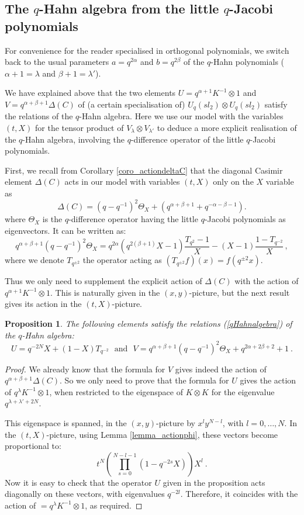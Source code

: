 \documentclass[a4paper,12pt]{article}
\numberwithin{equation}{section}
\newtheorem{prop}[theo]{Proposition}
\theoremstyle{rem}
\theoremstyle{definition}
\begin{document}
\subsection{The $q$-Hahn algebra from the little $q$-Jacobi polynomials}

For convenience for the reader specialised in orthogonal polynomials, we switch back to the usual parameters $a=q^{2\alpha}$ and $b=q^{2\beta}$ of the $q$-Hahn polynomials ($\alpha+1=\lambda$ and $\beta+1=\lambda'$).

We have explained above that the two elements $U=q^{\alpha+1}K^{-1}\otimes 1$ and $V=q^{\alpha+\beta+1}\Delta(C)$ of (a certain specialisation of) $U_q(sl_2)\otimes U_q(sl_2)$ satisfy the relations of the $q$-Hahn algebra. Here we use our model with the variables $(t,X)$ for the tensor product of $V_{\lambda}\otimes V_{\lambda'}$ to deduce a more explicit realisation of the $q$-Hahn algebra, involving the $q$-difference operator of the little $q$-Jacobi polynomials.

First, we recall from Corollary \ref{coro_actiondeltaC} that the diagonal Casimir element $\Delta(C)$ acts in our model with variables $(t,X)$ only on the $X$ variable as
\[\Delta(C)=(q-q^{-1})^2\Theta_X+(q^{\alpha+\beta+1}+q^{-\alpha-\beta-1}). \]
where $\Theta_X$ is the $q$-difference operator having the little $q$-Jacobi polynomials as eigenvectors. It can be written as:
\[q^{\alpha+\beta+1}(q-q^{-1})^2\Theta_X=q^{2\alpha}(q^{2(\beta+1)}X-1)\frac{T_{q^2}-1}{X}-(X-1)\frac{1-T_{q^{-2}}}{X}\,,\]
where we denote $T_{q^{\pm2}}$ the operator acting as $(T_{q^{\pm2}}f)(x)=f(q^{\pm2}x)$.

Thus we only need to supplement the explicit action of $\Delta(C)$ with the action of $q^{\alpha+1}K^{-1}\otimes 1$. This is naturally given in the $(x,y)$-picture, but the next result gives its action in the $(t,X)$-picture.

\begin{prop}
The following elements satisfy the relations (\ref{qHahnalgebra}) of the $q$-Hahn algebra:
\[U=q^{-2N}X+(1-X)T_{q^{-2}}\ \ \ \text{and}\ \ \ V=q^{\alpha+\beta+1}(q-q^{-1})^2\Theta_X+q^{2\alpha+2\beta+2}+1\ .\]
\end{prop}
\begin{proof}
We already know that the formula for $V$ gives indeed  the action of $q^{\alpha+\beta+1}\Delta(C)$. So we only need to prove that the formula for $U$ gives the action of $q^{\lambda}K^{-1}\otimes 1$, when restricted to the eigenspace of $K\otimes K$ for the eigenvalue $q^{\lambda+\lambda'+2N}$.

This eigenspace is spanned, in the $(x,y)$-picture by $x^{l}y^{N-l}$, with $l=0,\dots,N$. In the $(t,X)$-picture, using Lemma \ref{lemma_actionphi}, these vectors become proportional to:
\[t^{N}\left(\prod_{s=0}^{N-l-1}(1-q^{-2s}X)\right)X^l\ .\]
Now it is easy to check that the operator $U$ given in the proposition acts diagonally on these vectors, with eigenvalues $q^{-2l}$. Therefore, it coincides with the action of $=q^{\lambda}K^{-1}\otimes 1$, as required.
\end{proof}
\end{document}
